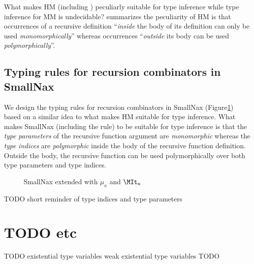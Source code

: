 What makes HM (including ) peculiarly suitable for
type inference while type inference for MM is undecidable?
\citet{Hen93} summarizes the peculiarity of HM is that occurrences of
a recursive definition ``\emph{inside} the body of its definition can
only be used \emph{monomorphically}'' whereas occurrences ``\emph{outside}
its body can be used \emph{polymorphically}''.

\subsection{Typing rules for recursion combinators in SmallNax}
We design the typing rules for recursion combinators in SmallNax
(Figure\;\ref{fig:SmallNaxRec}) based on a similar idea to
what makes HM suitable for type inference.
What makes SmallNax (including the  rule) to be suitable
for type inference is that the \emph{type parameters} of
the recursive function argument are \emph{monomorphic} whereas
the \emph{type indices} are \emph{polymorphic} inside the body of
the recursive function definition. Outside the body, the recursive function
can be used polymorphically over both type parameters and type indices.

\begin{figure}
\caption{SmallNax extended with $\mu_\kappa$ and $\MIt_\kappa$}
\label{fig:SmallNaxRec}
\end{figure}

TODO short reminder of type indices and type parameters

\section{TODO etc}
\label{sec:naxTyInfer:etc}
TODO
existential type variables
weak existential type variables
TODO

